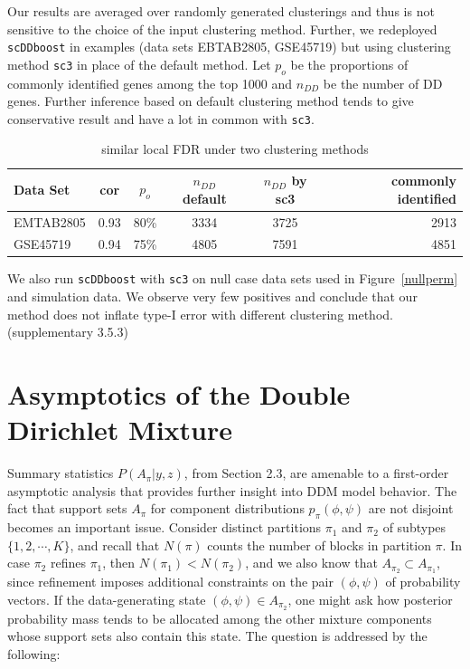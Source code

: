 \documentclass[aoas,preprint]{imsart}
\begin{document}
Our results are averaged over randomly generated clusterings and thus is not sensitive to the choice of the input clustering method.
Further, we redeployed \texttt{scDDboost} in examples (data sets EBTAB2805, GSE45719) but using clustering method \texttt{sc3} in place of the default method.
Let $p_o$ be the proportions of commonly identified genes among the top 1000 and $n_{DD}$ be the number of DD genes. Further inference based on default clustering method tends to give conservative result and have a lot in common with \texttt{sc3}. 
\begin{table}[htbp]
  \begin{center}
  \begin{tabular}{@{} lccccr @{}} %
      \toprule
      \cmidrule(r){1-5} %
      Data Set   & cor &
      $p_o$ & $n_{DD}$ default & $n_{DD}$ by sc3 & commonly identified\\
      \midrule
      EMTAB2805  & 0.93 & 80\% & 3334 & 3725 & 2913\\          
      GSE45719   & 0.94 & 75\% & 4805 & 7591 & 4851\\
      \bottomrule
  \end{tabular}
  \caption{similar local FDR under two clustering methods}
  \label{tab:dist}
  \end{center}
\end{table}
We also run \texttt{scDDboost} with \texttt{sc3} on null case data sets used in Figure~\ref{nullperm} and simulation data. 
We observe very few positives and conclude that our method does not inflate type-I error with different clustering method.(supplementary 3.5.3)


\section{Asymptotics of the Double Dirichlet Mixture}
Summary statistics $P(A_\pi|y,z)$, from Section 2.3, are amenable to a first-order asymptotic analysis
that provides further insight into DDM model behavior.  The fact that support sets $A_\pi$ for component 
distributions $p_\pi( \phi,\psi)$ are not disjoint becomes an important issue.  Consider
distinct partitions $\pi_1$ and $\pi_2$  of subtypes $\{ 1, 2, \cdots, K\}$, and recall that $N(\pi)$ counts
 the number of blocks in partition $\pi$.   In case $\pi_2$ refines $\pi_1$, then $N(\pi_1) < N(\pi_2)$,
and  we also know that 
 $A_{\pi_2} \subset A_{\pi_1}$, since refinement 
imposes additional constraints on the pair $(\phi, \psi)$ of probability vectors.   
If the data-generating state $(\phi, \psi) \in A_{\pi_2}$, one might ask how posterior probability mass
tends to be allocated among the other mixture components whose
 support sets also contain this state.     The question is addressed 
by the following:
\end{document}
